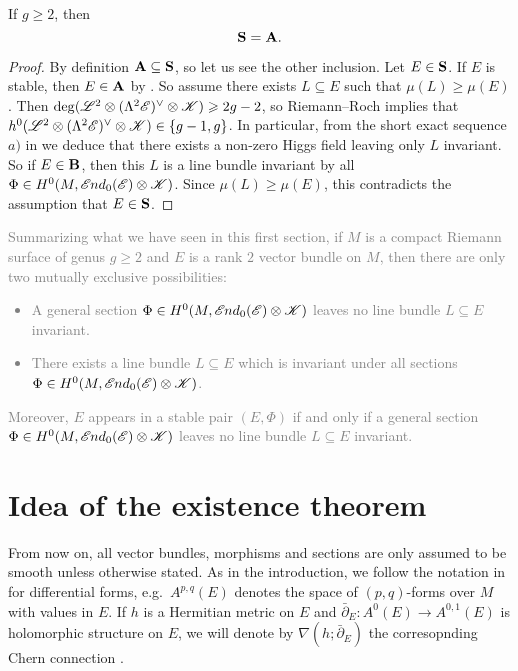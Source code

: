 \documentclass[A4paper, 12pt, british, reqno]{amsart}
\newcommand{\ot}{\otimes}
\newcommand{\dual}{^{\vee}}
\newcommand{\1}{\mathbbm{1}}
\begin{document}
\begin{prop}\label{prop:general}
    If $g\geqslant 2$, then
    \[ \mathbf{S}=\mathbf{A}. \]
    \begin{proof}
	By definition $\mathbf{A}\subseteq \mathbf{S}$, so let us see the other inclusion.
	Let $E\in \mathbf{S}$.
	If $E$ is stable, then $E\in \mathbf{A}$ by .
	So assume there exists $L\subseteq E$ such that $\mu(L)\geqslant \mu(E)$.
	Then $\deg(\L^{2}\ot(\Lambda^{2}\E)\dual\ot\sK)\geqslant 2g-2$, so Riemann--Roch implies that $h^{0}(\L^{2}\ot(\Lambda^{2}\E)\dual\ot\sK)\in \{g-1,g\}$.
	In particular, from the short exact sequence $a)$ in  we deduce that there exists a non-zero Higgs field leaving only $L$ invariant.
	So if $E\in \mathbf{B}$, then this $L$ is a line bundle invariant by all $\Phi\in H^{0}(M,\sEnd_{0}(\E)\ot \sK)$.
	Since $\mu(L)\geqslant \mu(E)$, this contradicts the assumption that $E\in \mathbf{S}$.
    \end{proof}
\end{prop}

\textcolor{gray}{%
Summarizing what we have seen in this first section, if $M$ is a compact Riemann surface of genus $g\geqslant 2$ and $E$ is a rank $2$ vector bundle on $M$, then there are only two mutually exclusive possibilities:
    \begin{itemize}
	\item A general section $\Phi\in H^{0}(M,\sEnd_{0}(\E)\ot \sK)$ leaves no line bundle $L\subseteq E$ invariant.
	\item There exists a line bundle $L\subseteq E$ which is invariant under all sections $\Phi\in H^{0}(M,\sEnd_{0}(\E)\ot \sK)$.
    \end{itemize}
    Moreover, $E$ appears in a stable pair $(E,\Phi)$ if and only if a general section $\Phi\in H^{0}(M,\sEnd_{0}(\E)\ot\sK)$ leaves no line bundle $L\subseteq E$ invariant.
}

\section{Idea of the existence theorem}

\begin{unota}
    From now on, all vector bundles, morphisms and sections are only assumed to be smooth unless otherwise stated.
    As in the introduction, we follow the notation in \cite{kob87} for differential forms, e.g.~$A^{p,q}(E)$ denotes the space of $(p,q)$-forms over $M$ with values in $E$.
    If $h$ is a Hermitian metric on $E$ and $\bar{\partial}_{E}\colon A^{0}(E)\to A^{0,1}(E)$ is holomorphic structure on $E$, we will denote by $\nabla(h;\bar{\partial}_{E})$ the corresopnding Chern connection \cite[Proposition 4.2.14]{huy05}.
\end{unota}
\end{document}
